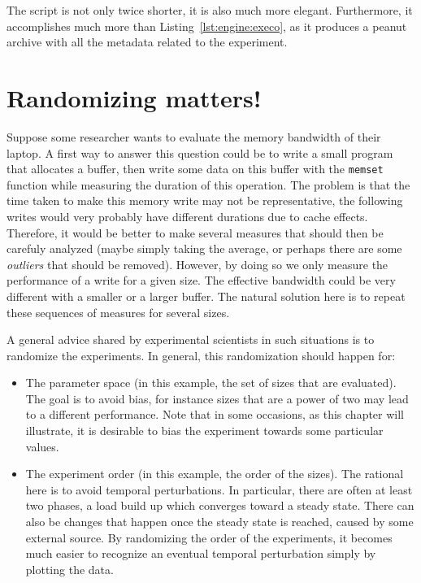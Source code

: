             The script is not only twice shorter, it is also much more elegant. Furthermore, it accomplishes much more
            than Listing~\ref{lst:engine:execo}, as it produces a peanut archive with all the metadata related to the
            experiment.

\chapter{Randomizing matters!}%
\label{chapter:experiment:randomizing}
    Suppose some researcher wants to evaluate the memory bandwidth of their laptop. A first way to answer this question
    could be to write a small program that allocates a buffer, then write some data on this buffer with the
    \texttt{memset} function while measuring the duration of this operation. The problem is that the time taken to make
    this memory write may not be representative, the following writes would very probably have different durations due
    to cache effects.  Therefore, it would be better to make several measures that should then be carefuly analyzed
    (maybe simply taking the average, or perhaps there are some \emph{outliers} that should be removed). However, by
    doing so we only measure the performance of a write for a given size. The effective bandwidth could be very
    different with a smaller or a larger buffer. The natural solution here is to repeat these sequences of measures for
    several sizes.

    A general advice shared by experimental scientists in such situations is to randomize the experiments. In general,
    this randomization should happen for:
    \begin{itemize}
        \item The parameter space (in this example, the set of sizes that are evaluated). The goal is to avoid bias, for
            instance sizes that are a power of two may lead to a different performance. Note that in some occasions, as
            this chapter will illustrate, it is desirable to bias the experiment towards some particular values.
        \item The experiment order (in this example, the order of the sizes). The rational here is to avoid temporal
            perturbations. In particular, there are often at least two phases, a load build up which converges toward a
            steady state. There can also be changes that happen once the steady state is reached, \eg caused by some
            external source. By randomizing the order of the experiments, it becomes much easier to recognize an
            eventual temporal perturbation simply by plotting the data.
    \end{itemize}

